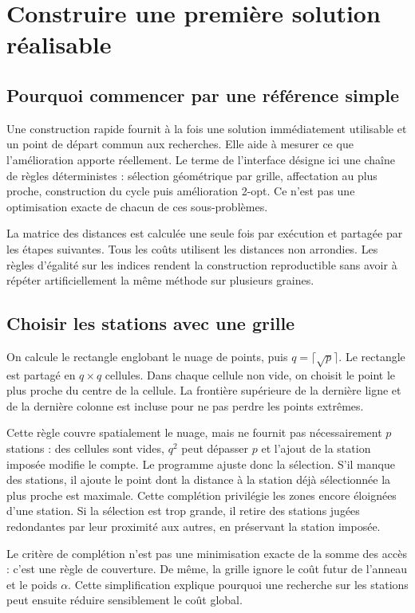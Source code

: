 \chapter{Construire une première solution réalisable}
\section{Pourquoi commencer par une référence simple}
Une construction rapide fournit à la fois une solution immédiatement utilisable
et un point de départ commun aux recherches. Elle aide à mesurer ce que
l'amélioration apporte réellement. Le terme  de l'interface désigne
ici une chaîne de règles déterministes : sélection géométrique par grille,
affectation au plus proche, construction du cycle puis amélioration 2-opt.
Ce n'est pas une optimisation exacte de chacun de ces sous-problèmes.

La matrice des distances est calculée une seule fois par exécution et partagée
par les étapes suivantes. Tous les coûts utilisent les distances non arrondies.
Les règles d'égalité sur les indices rendent la construction reproductible sans
avoir à répéter artificiellement la même méthode sur plusieurs graines.

\section{Choisir les stations avec une grille}
On calcule le rectangle englobant le nuage de points, puis
$q=\lceil\sqrt{p}\rceil$. Le rectangle est partagé en $q\times q$ cellules.
Dans chaque cellule non vide, on choisit le point le plus proche du centre de
la cellule. La frontière supérieure de la dernière ligne et de la dernière
colonne est incluse pour ne pas perdre les points extrêmes.

Cette règle couvre spatialement le nuage, mais ne fournit pas nécessairement
$p$ stations : des cellules sont vides, $q^2$ peut dépasser $p$ et l'ajout de
la station imposée modifie le compte. Le programme ajuste donc la sélection.
S'il manque des stations, il ajoute le point dont la distance à la station déjà
sélectionnée la plus proche est maximale. Cette complétion privilégie les zones
encore éloignées d'une station. Si la sélection est trop grande, il retire des
stations jugées redondantes par leur proximité aux autres, en préservant la
station imposée.

Le critère de complétion n'est pas une minimisation exacte de la somme des
accès : c'est une règle de couverture. De même, la grille ignore le coût futur
de l'anneau et le poids $\alpha$. Cette simplification explique pourquoi une
recherche sur les stations peut ensuite réduire sensiblement le coût global.

